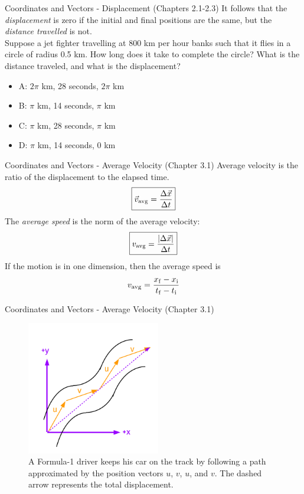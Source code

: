 \documentclass{beamer}
\begin{document}
\begin{frame}{Coordinates and Vectors - Displacement (Chapters 2.1-2.3)}
It follows that the \textit{displacement} is zero if the initial and final positions are the same, but the \textit{distance travelled} is not.\\
\vspace{0.2cm}
\small
Suppose a jet fighter travelling at 800 km per hour banks such that it flies in a circle of radius 0.5 km.  How long does it take to complete the circle?  What is the distance traveled, and what is the displacement?
\begin{itemize}
\item A: $2\pi$ km, 28 seconds, $2\pi$ km
\item B: $\pi$ km, 14 seconds, $\pi$ km
\item C: $\pi$ km, 28 seconds, $\pi$ km
\item D: $\pi$ km, 14 seconds, $0$ km
\end{itemize}
\end{frame}

\begin{frame}{Coordinates and Vectors - Average Velocity  (Chapter 3.1)}
\alert{Average velocity} is the ratio of the \alert{displacement} to the elapsed time.\\
\begin{equation}
\boxed{\vec{v}_{\rm avg} = \frac{\Delta \vec{x}}{\Delta t}}
\end{equation}
The \textit{average speed} is the norm of the average velocity:
\begin{equation}
\boxed{v_{\rm avg} = \frac{|\Delta \vec{x}|}{\Delta t}}
\end{equation}
If the motion is in one dimension, then the average speed is
\begin{equation}
v_{\rm avg} = \frac{x_{\rm f} - x_{\rm i}}{t_{\rm f} - t_{\rm i}}
\end{equation}
\end{frame}

\begin{frame}{Coordinates and Vectors - Average Velocity (Chapter 3.1)}
\begin{figure}
\centering
\includegraphics[width=0.52\textwidth]{figures/AveVelocity.pdf}
\caption{\label{fig:avevel} A Formula-1 driver keeps his car on the track by following a path approximated by the position vectors $u$, $v$, $u$, and $v$.  The dashed arrow represents the total displacement.}
\end{figure}
\end{frame}
\end{document}
